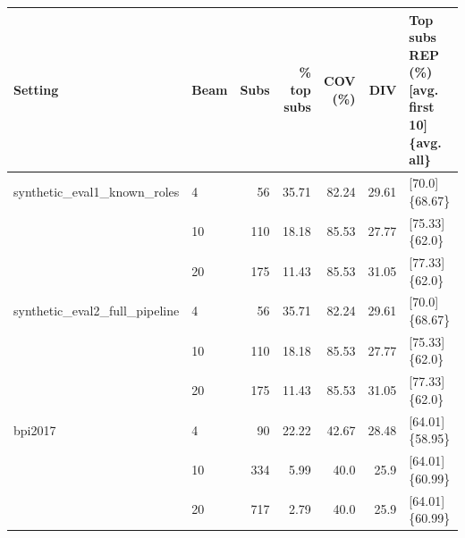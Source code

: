\begin{tabular}{llrrrrl}
\hline
Setting & Beam & Subs & \% top subs & COV (\%) & DIV & Top subs REP (\%) [avg. first 10] \{avg. all\} \\
\hline
synthetic\_eval1\_known\_roles & 4 & 56 & 35.71 & 82.24 & 29.61 & [70.0]\{68.67\} \\
 & 10 & 110 & 18.18 & 85.53 & 27.77 & [75.33]\{62.0\} \\
 & 20 & 175 & 11.43 & 85.53 & 31.05 & [77.33]\{62.0\} \\
\hline
synthetic\_eval2\_full\_pipeline & 4 & 56 & 35.71 & 82.24 & 29.61 & [70.0]\{68.67\} \\
 & 10 & 110 & 18.18 & 85.53 & 27.77 & [75.33]\{62.0\} \\
 & 20 & 175 & 11.43 & 85.53 & 31.05 & [77.33]\{62.0\} \\
\hline
bpi2017 & 4 & 90 & 22.22 & 42.67 & 28.48 & [64.01]\{58.95\} \\
 & 10 & 334 & 5.99 & 40.0 & 25.9 & [64.01]\{60.99\} \\
 & 20 & 717 & 2.79 & 40.0 & 25.9 & [64.01]\{60.99\} \\
\hline
\end{tabular}
